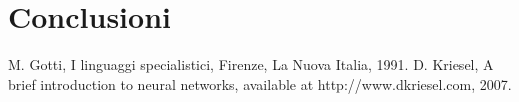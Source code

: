 \documentclass[a4paper,12pt]{report}
\begin{document}
% 
% 
\chapter{Conclusioni}
\label{cap4}

%
%
\begin{thebibliography}{00}
%
M. Gotti, I linguaggi specialistici, Firenze, La Nuova Italia, 1991.
%
D. Kriesel, A brief introduction to neural networks, available at http://www.dkriesel.com, 2007. %
%

\end{thebibliography}
% 
\end{document}

